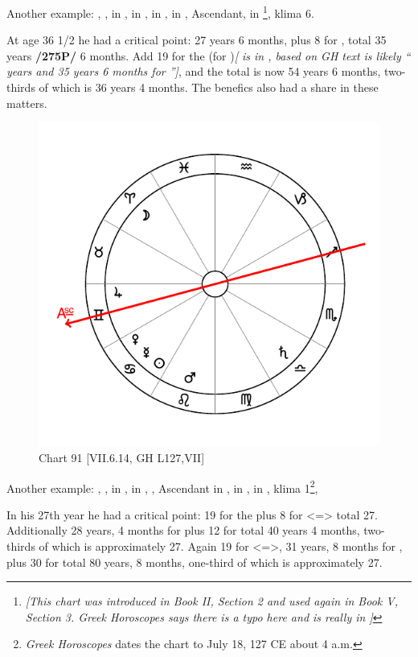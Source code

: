 Another example: \Sun, \Mars, \Venus\xspace in \Sagittarius, \Moon\xspace in \Libra, \Saturn\xspace in \Gemini, \Jupiter\xspace in \Virgo, Ascendant, \Mercury\xspace in \Capricorn \footnote{\textit{[This chart was introduced in Book II, Section 2 and used again in Book V, Section 3.  Greek Horoscopes says there is a typo here and \Mercury\xspace is really in \Scorpio]}}, klima 6. 

At age 36 1/2 he had a critical point: 27 years 6 months, plus 8 for \Venus, total 35 years \textbf{/275P/} 6 months. Add 19 for the \Sun\xspace (for \Gemini)\textit{[ \Sun\xspace is in \Sagittarius, based on GH text is likely ``\Sun\xspace 19 years and 35 years 6 months for \Sagittarius'']}, and the total is now 54 years 6 months, two-thirds of which is 36 years 4 months. The benefics also had a share in these matters. 

\newpage
\begin{figure}
\centering
\vspace{0pt}
\includegraphics[width=.68\textwidth]{charts/7_6_14}
\caption{Chart 91 [VII.6.14, GH L127,VII] }
\label{fig:chart91}
\end{figure} 

Another example: \Sun, \Mercury, \Venus\xspace in \Cancer, \Moon\xspace in \Aries, \Jupiter, Ascendant in \Gemini, \Saturn\xspace in \Libra, \Mars\xspace in \Leo, klima 1\footnote{\textit{Greek Horoscopes} dates the chart to July 18, 127 CE about 4 a.m.},

In his 27th year he had a critical point: 19 for the \Sun\xspace plus 8 for \Libra\xspace <=\Venus> total 27. Additionally 28 years, 4 months for \Gemini\xspace plus 12 for \Jupiter\xspace total 40 years 4
months, two-thirds of which is approximately 27. Again 19 for \Leo\xspace <=\Sun>, 31 years, 8 months for \Cancer, plus 30 for \Saturn\xspace total 80 years, 8 months, one-third of which is approximately 27.

